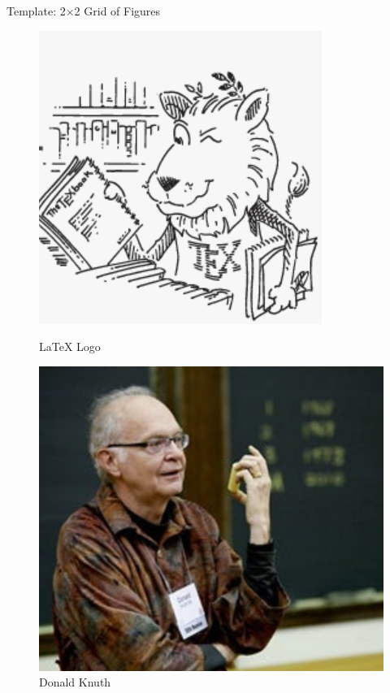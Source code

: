 \begin{frame}{Template: 2×2 Grid of Figures}
     \begin{figure}
          \centering
          \begin{minipage}{0.2\textwidth}
               \centering
               \includegraphics[width=\textwidth]{figs/latex_logo}
               \caption{LaTeX Logo}
               \label{fig:grid_tl}
          \end{minipage}
          \hspace{1cm}  %
          \begin{minipage}{0.2\textwidth}
               \centering
               \includegraphics[width=\textwidth]{figs/knuth}
               \caption{Donald Knuth}
               \label{fig:grid_tr}
          \end{minipage}
          

\end{figure}
\end{frame}
